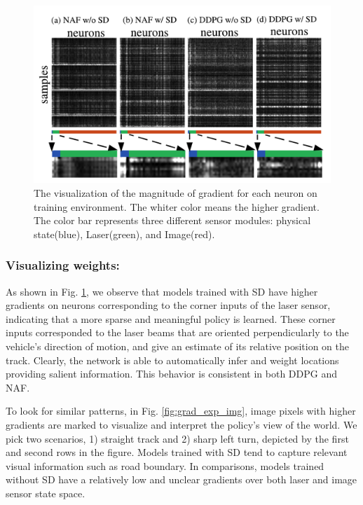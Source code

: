 \documentclass[../thesis.tex]{subfiles}
\begin{document}
\begin{figure}[t]
\begin{center}
\centerline{\includegraphics[width=\columnwidth]{./MultimodalDRL/fig/grad2.png}}
\caption{The visualization of the magnitude of gradient for each neuron on training environment. The whiter color means the higher gradient. The color bar represents three different sensor modules: physical state(blue), Laser(green), and Image(red).}
\label{fig:grad_exp}
\end{center}
\end{figure} 

\subsubsection{Visualizing weights:}
As shown in Fig. \ref{fig:grad_exp}, we observe that models trained with SD have higher gradients on neurons corresponding to the corner inputs of the laser sensor, indicating that a more sparse and meaningful policy is learned. These corner inputs corresponded to the laser beams that are oriented perpendicularly to the vehicle's direction of motion, and give an estimate of its relative position on the track. Clearly, the network is able to automatically infer and weight locations providing salient information. This behavior is consistent in both DDPG and NAF.

To look for similar patterns, in Fig. \ref{fig:grad_exp_img}, image pixels with higher gradients are marked to visualize and interpret the policy's view of the world. We pick two scenarios, 1) straight track and 2) sharp left turn, depicted by the first and second rows in the figure. Models trained with SD tend to capture relevant visual information such as road boundary. In comparisons, models trained without SD have a relatively low and unclear gradients over both laser and image sensor state space.
\end{document}

